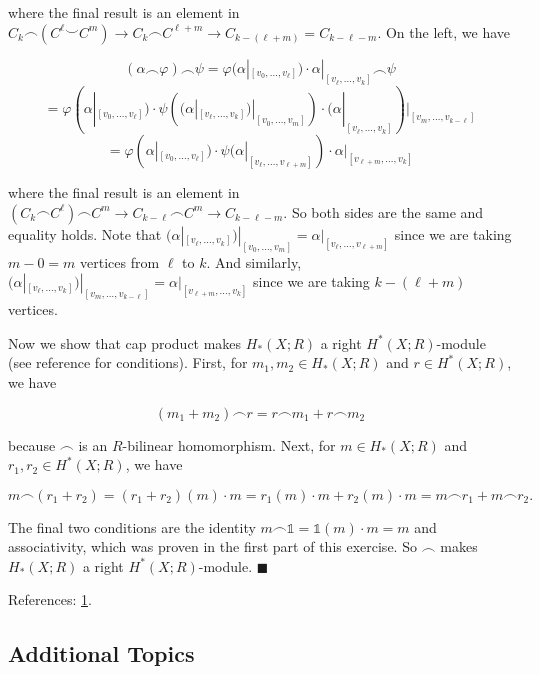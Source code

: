 \documentclass{article}
\begin{document}
where the final result is an element in $C_{k}\frown (C^{\ell}\smile C^{m})\to C_{k}\frown C^{\ell+m}\to C_{k-(\ell+m)} = C_{k-\ell-m}$. On the left, we have

$$(\alpha\frown\varphi)\frown \psi = \varphi(\alpha|_{[v_{0},\ldots,v_{\ell}]})\cdot \alpha|_{[v_{\ell},\ldots,v_{k}]} \frown \psi$$
$$= \varphi(\alpha|_{[v_{0},\ldots, v_{\ell}]})\cdot \psi\left((\alpha|_{[v_{\ell},\ldots,v_{k}]})|_{[v_{0},\ldots, v_{m}]}\right)\cdot (\alpha|_{[v_{\ell},\ldots,v_{k}]})|_{[v_{m},\ldots,v_{k-\ell}]}$$
$$= \varphi(\alpha|_{[v_{0},\ldots, v_{\ell}]})\cdot \psi(\alpha|_{[v_{\ell},\ldots,v_{\ell+m}]})\cdot \alpha|_{[v_{\ell+m},\ldots,v_{k}]}$$

where the final result is an element in $(C_{k}\frown C^{\ell})\frown C^{m}\to C_{k-\ell}\frown C^{m}\to C_{k-\ell-m}$. So both sides are the same and equality holds. Note that $(\alpha|_{[v_{\ell},\ldots,v_{k}]})|_{[v_{0},\ldots, v_{m}]} = \alpha|_{[v_{\ell},\ldots,v_{\ell+m}]}$ since we are taking $m - 0 = m$ vertices from $\ell$ to $k$. And similarly, $(\alpha|_{[v_{\ell},\ldots,v_{k}]})|_{[v_{m},\ldots,v_{k-\ell}]} = \alpha|_{[v_{\ell+m},\ldots,v_{k}]}$ since we are taking $k - (\ell + m)$ vertices.
\medskip

Now we show that cap product makes $H_{\ast}(X; R)$ a right $H^{\ast}(X; R)$-module (see reference for conditions). First, for $m_{1}, m_{2}\in H_{\ast}(X;R)$ and $r\in H^{\ast}(X; R)$, we have

$$(m_{1}+m_{2})\frown r = r\frown m_{1} + r\frown m_{2}$$

because $\frown$ is an $R$-bilinear homomorphism. Next, for $m\in H_{\ast}(X; R)$ and $r_{1}, r_{2}\in H^{\ast}(X;R)$, we have

$$m\frown (r_{1} + r_{2}) = (r_{1} + r_{2})(m)\cdot m = r_{1}(m)\cdot m + r_{2}(m)\cdot m = m\frown r_{1} + m\frown r_{2}.$$

The final two conditions are the identity $m\frown \mathds{1} = \mathds{1}(m)\cdot m = m$ and associativity, which was proven in the first part of this exercise. So $\frown$ makes $H_{\ast}(X; R)$ a right $H^{\ast}(X; R)$-module. $\blacksquare$
\medskip

References: \href{https://math.stackexchange.com/questions/144518/what-exactly-is-an-r-module}{1}.
\bigskip
\bigskip

\subsection*{Additional Topics}
\end{document}
